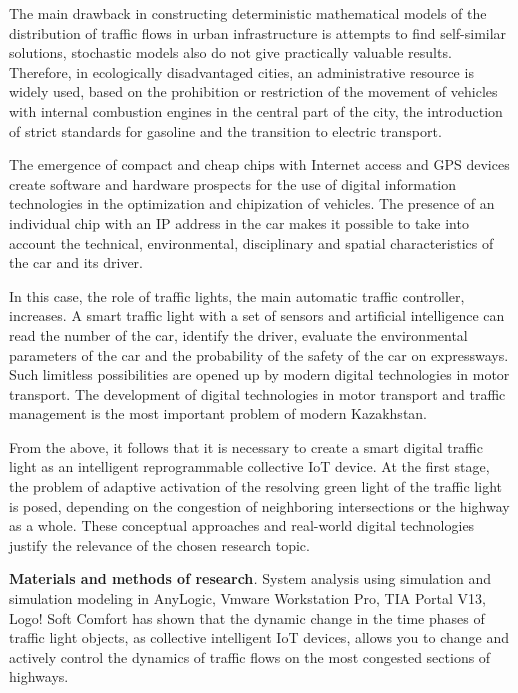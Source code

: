 The main drawback in constructing deterministic mathematical models of
the distribution of traffic flows in urban infrastructure is attempts to
find self-similar solutions, stochastic models also do not give
practically valuable results. Therefore, in ecologically disadvantaged
cities, an administrative resource is widely used, based on the
prohibition or restriction of the movement of vehicles with internal
combustion engines in the central part of the city, the introduction of
strict standards for gasoline and the transition to electric transport.

The emergence of compact and cheap chips with Internet access and GPS
devices create software and hardware prospects for the use of digital
information technologies in the optimization and chipization of
vehicles. The presence of an individual chip with an IP address in the
car makes it possible to take into account the technical, environmental,
disciplinary and spatial characteristics of the car and its driver.

In this case, the role of traffic lights, the main automatic traffic
controller, increases. A smart traffic light with a set of sensors and
artificial intelligence can read the number of the car, identify the
driver, evaluate the environmental parameters of the car and the
probability of the safety of the car on expressways. Such limitless
possibilities are opened up by modern digital technologies in motor
transport. The development of digital technologies in motor transport
and traffic management is the most important problem of modern
Kazakhstan.

From the above, it follows that it is necessary to create a smart
digital traffic light as an intelligent reprogrammable collective IoT
device. At the first stage, the problem of adaptive activation of the
resolving green light of the traffic light is posed, depending on the
congestion of neighboring intersections or the highway as a whole. These
conceptual approaches and real-world digital technologies justify the
relevance of the chosen research topic.

\textbf{Materials and methods of research}\emph{.} System analysis using
simulation and simulation modeling in AnyLogic, Vmware Workstation Pro,
TIA Portal V13, Logo! Soft Comfort has shown that the dynamic change in
the time phases of traffic light objects, as collective intelligent IoT
devices, allows you to change and actively control the dynamics of
traffic flows on the most congested sections of highways.

